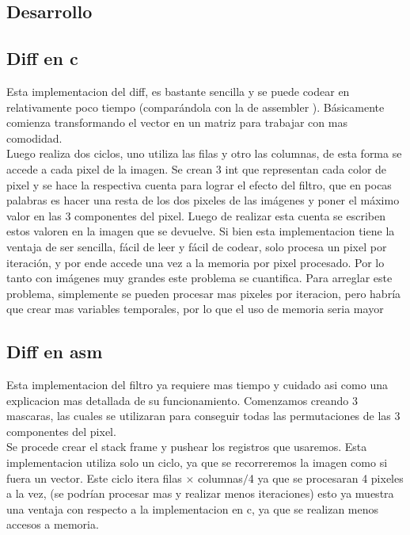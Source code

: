 \subsection{Desarrollo}

\subsection{Diff en c}

Esta implementacion del diff, es bastante sencilla y se puede codear en relativamente poco tiempo (comparándola con la de assembler ). Básicamente comienza transformando el vector en un matriz para trabajar con mas comodidad. \\
Luego realiza dos ciclos, uno utiliza las filas y otro las columnas, de esta forma se accede a cada pixel de la imagen. Se crean 3 int que representan cada color de pixel y se hace la respectiva cuenta para lograr el efecto del filtro, que en pocas palabras es hacer una resta de los dos pixeles de las imágenes y poner el máximo valor en las 3 componentes del pixel. Luego de realizar esta cuenta se escriben estos valoren en la imagen que se devuelve. Si bien esta implementacion tiene la ventaja de ser sencilla, fácil de leer y fácil de codear, solo procesa un pixel por iteración, y por ende accede una vez a la memoria por pixel procesado. Por lo tanto con imágenes muy grandes este problema se cuantifica. Para arreglar este problema, simplemente se pueden procesar mas pixeles por iteracion, pero habría que crear mas variables temporales, por lo que el uso de memoria seria mayor
 
\subsection{Diff en asm}

Esta implementacion del filtro ya requiere mas tiempo y cuidado asi como una explicacion mas detallada de su funcionamiento. Comenzamos creando 3 mascaras, las cuales se utilizaran para conseguir todas las permutaciones de las 3 componentes del pixel. \\
Se procede crear el stack frame y pushear los registros que usaremos. Esta implementacion utiliza solo un ciclo, ya que se recorreremos la imagen como si fuera un vector. Este ciclo itera filas $\times$ columnas$/$4  ya que se procesaran 4 pixeles a la vez, (se podrían procesar mas y realizar menos iteraciones) esto ya muestra una ventaja con respecto a la implementacion en c, ya que se realizan menos accesos a memoria. \\


